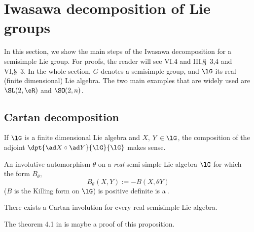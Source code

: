 
\section{Iwasawa decomposition of Lie groups}%

In this section, we show the main steps of the Iwasawa decomposition for a semisimple Lie group. For proofs, the reader will see \cite{Knapp} VI.4 and \cite{Helgason} III,\S\ 3,4 and VI,\S\ 3. In the whole section, $G$ denotes a semisimple group, and $\lG$ its real (finite dimensional) Lie algebra. The two main examples that are widely used are $\SL(2,\eR)$ and $\SO(2,n)$.

\subsection{Cartan decomposition}

If $\lG$ is a finite dimensional Lie algebra and $X$, $Y\in\lG$, the composition of the adjoint $\dpt{\ad X\circ \ad Y}{\lG}{\lG}$ makes sense.
\begin{definition}
An involutive automorphism $\theta$ on a \emph{real} semi simple Lie algebra $\lG $ for which the form $B_{\theta}$,
\begin{equation}
          B_{\theta}(X,Y):=-B(X,\theta Y)
\end{equation}
($B$ is the Killing form on $\lG$) is positive definite is a .
\end{definition}

\begin{proposition}
There exists a Cartan involution for every real semisimple Lie algebra.
\end{proposition}

\begin{probleme}
The theorem 4.1 in \cite{Helgason} is maybe a proof of this proposition.
\end{probleme}

